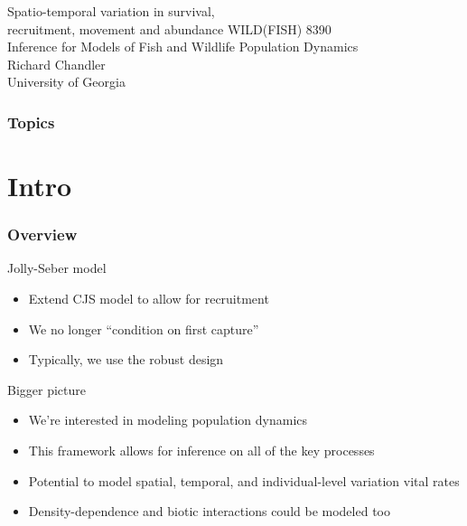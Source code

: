 \documentclass[color=usenames,dvipsnames]{beamer}\usepackage[]{graphicx}\usepackage[]{xcolor}
\begin{document}
\begin{frame}[plain]
  \centering
  \LARGE
  Spatio-temporal variation in %
  survival, \\ recruitment, movement and abundance %
  \vfill
  \large
  WILD(FISH) 8390 \\
  Inference for Models of Fish and Wildlife Population Dynamics \\
  \vfill
  Richard Chandler \\
  University of Georgia \\
\end{frame}







\begin{frame}[plain]
  \frametitle{Topics}
  \Large
\end{frame}




\section{Intro}






\begin{frame}
  \frametitle{Overview}
  {Jolly-Seber model}
  \begin{itemize}
    \normalsize
    \item Extend CJS model to allow for recruitment
    \item We no longer ``condition on first capture''
    \item Typically, we use the robust design
  \end{itemize}
  \pause \vfill
  Bigger picture
  \begin{itemize}
    \normalsize
    \item<2-> We're interested in modeling population dynamics
    \item<3-> This framework allows for inference on \alert{all} of the
      key processes 
    \item<4-> Potential to model spatial, temporal, and individual-level
      variation vital rates
    \item<5-> Density-dependence and biotic interactions could be
      modeled too
  \end{itemize}
\end{frame}
\end{document}
